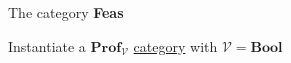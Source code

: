 The category \textbf{Feas}

Instantiate a $\mathbf{Prof}_\mathcal{V}$ \href{doc/1 math/Seven Sketches in Compositionality/Chapter 4: Co-design/3 Categories of profunctors/2 The categories V-Prof and Feas/1 V-profunctor category}{category} with $\mathcal{V}=\mathbf{Bool}$
